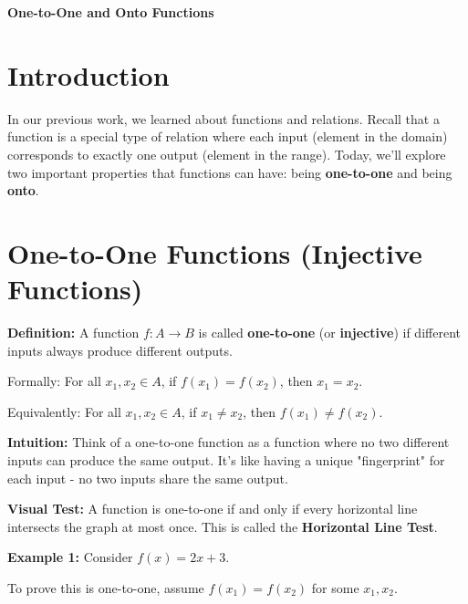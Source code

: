 \documentclass[12pt]{article}
\begin{document}
\begin{center}
\textbf{\Large One-to-One and Onto Functions} \\
\vspace{0.5cm}
\hspace{0.1\textwidth}
\end{center}

\vspace{0.5cm}

\section{Introduction}

In our previous work, we learned about functions and relations. Recall that a function is a special type of relation where each input (element in the domain) corresponds to exactly one output (element in the range). Today, we'll explore two important properties that functions can have: being \textbf{one-to-one} and being \textbf{onto}.

\section{One-to-One Functions (Injective Functions)}

\textbf{Definition:} A function $f: A \to B$ is called \textbf{one-to-one} (or \textbf{injective}) if different inputs always produce different outputs. 

Formally: For all $x_1, x_2 \in A$, if $f(x_1) = f(x_2)$, then $x_1 = x_2$.

Equivalently: For all $x_1, x_2 \in A$, if $x_1 \neq x_2$, then $f(x_1) \neq f(x_2)$.

\vspace{0.7cm}

\textbf{Intuition:} Think of a one-to-one function as a function where no two different inputs can produce the same output. It's like having a unique "fingerprint" for each input - no two inputs share the same output.

\textbf{Visual Test:} A function is one-to-one if and only if every horizontal line intersects the graph at most once. This is called the \textbf{Horizontal Line Test}.

\vspace{0.7cm}

\textbf{Example 1:} Consider $f(x) = 2x + 3$.

To prove this is one-to-one, assume $f(x_1) = f(x_2)$ for some $x_1, x_2$.
\end{document}
